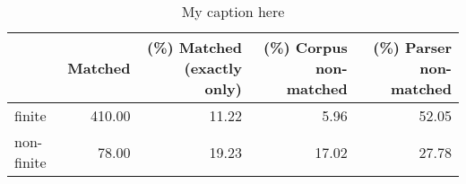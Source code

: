 \begin{table}[!ht]
\centering
\begin{tabular}{lrrrr}
\toprule
{} &  Matched &  (\%) Matched (exactly only) &  (\%) Corpus non-matched &  (\%) Parser non-matched \\
\midrule
finite     &   410.00 &                       11.22 &                    5.96 &                   52.05 \\
non-finite &    78.00 &                       19.23 &                   17.02 &                   27.78 \\
\bottomrule
\end{tabular}
\caption{My caption here}
\label{tab:FINITENESS-ocd-relative}
\end{table}